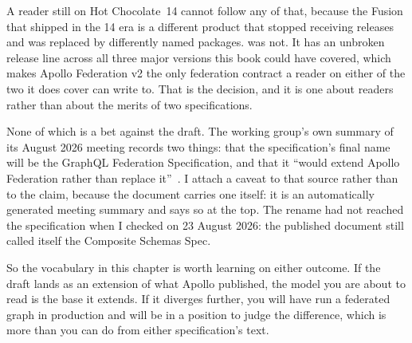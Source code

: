 %
A reader still on Hot Chocolate~14 cannot follow any of that, because the
Fusion that shipped in the 14 era is a different product that stopped receiving
releases and was replaced by differently named packages. 
was not. It has an unbroken release line across all three major versions this
book could have covered, which makes Apollo Federation v2 the only federation
contract a reader on either of the two it does cover can write to. That is the
decision, and it is one about readers rather than about the merits of two
specifications.

%
None of which is a bet against the draft. The working group's own summary of its
August 2026 meeting records two things: that the specification's
final name will be the GraphQL Federation Specification, and that it
\enquote{would extend Apollo Federation rather than replace
it}~\autocite{compositeschemaswg202608}. I attach a caveat to that source rather
than to the claim, because the document carries one itself: it is an
automatically generated meeting summary and says so at the top. The rename had
not reached the specification when I checked on 23 August 2026: the published
document still called itself the Composite Schemas Spec.

%
So the vocabulary in this chapter is worth learning on either outcome. If the
draft lands as an extension of what Apollo published, the model you are about to
read is the base it extends. If it diverges further, you will have run a
federated graph in production and will be in a position to judge the difference,
which is more than you can do from either specification's text.
%
